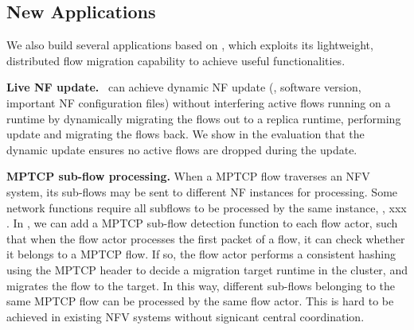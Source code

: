 \subsection{New Applications}

We also build several applications based on \nfactor, which exploits its lightweight, distributed flow migration capability to achieve useful functionalities. %

\noindent\textbf{Live NF update.} %
 \nfactor~can achieve dynamic NF update (\eg, software version, important NF configuration files) without interfering active flows running on a runtime by dynamically migrating the flows out to a replica runtime, performing update and migrating the flows back. We show in the evaluation that the dynamic update ensures no active flows are dropped during the update.


\noindent\textbf{MPTCP sub-flow processing.} When a MPTCP \cite{} flow traverses an NFV system, its sub-flows may be sent to different NF instances for processing. Some network functions require all subflows to be processed by the same instance, \eg, xxx . %
In \nfactor, we can add a MPTCP sub-flow detection function to each flow actor, such that when the flow actor processes the first packet of a flow, it can check whether it belongs to a MPTCP flow. If so, the flow actor performs a consistent hashing using the MPTCP header to decide a migration target runtime in the cluster, and migrates the flow to the target. In this way, different sub-flows belonging to the same MPTCP flow can be processed by the same flow actor. This is hard to be achieved in existing NFV systems without signicant central coordination. %

